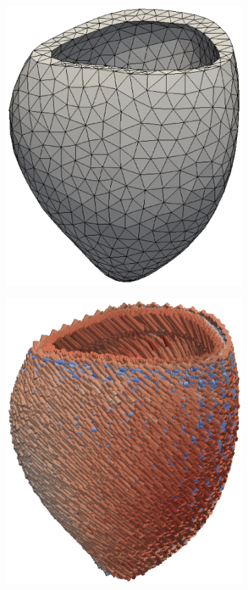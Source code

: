 \begin{figure}[htbp]
\begin{subfigure}[t]{0.25\textwidth}
    \includegraphics[width=\textwidth, trim={15cm 4cm 21cm 3cm}, clip]{mesh}
    \caption{\label{fig:compgeo_mesh}}    
\end{subfigure}
\qquad
\begin{subfigure}[t]{0.25\textwidth}
    \includegraphics[width=\textwidth, trim={15cm 4cm 21cm 3cm}, clip]{fibers}

\end{subfigure}
\end{figure}
